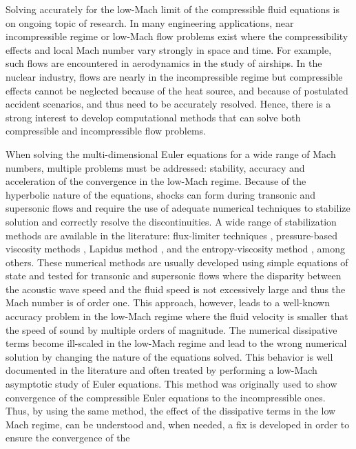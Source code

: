 \documentclass[preprint,10pt]{elsarticle}
\begin{document}
Solving accurately for the low-Mach limit of the compressible fluid equations is on ongoing topic of research. 
In many engineering applications, near incompressible regime or low-Mach flow problems exist where the compressibility effects and local
Mach number vary strongly in space and time. For example, such flows are encountered 
in aerodynamics in the study of airships. In the nuclear industry, flows are nearly in the incompressible regime but 
compressible effects cannot be neglected because of the heat source, and because of postulated accident scenarios, 
and thus need to be accurately resolved. Hence, there is a strong interest to develop computational methods 
that can solve both compressible and incompressible flow problems.  

When solving the multi-dimensional Euler equations for a wide range of Mach numbers, multiple problems must be addressed: stability, 
accuracy and acceleration of the convergence in the low-Mach regime. Because of the hyperbolic nature of the equations, 
shocks can form during transonic and supersonic flows and require the use of adequate numerical techniques to stabilize solution
and correctly resolve the discontinuities. A wide range of stabilization methods are available in the literature: flux-limiter techniques 
\cite{FluxLimiter, FluxLimiter2}, pressure-based viscosity methods \cite{PBV_book}, Lapidus method \cite{Lapidus_paper, LMP, Lapidus_book}, 
and the entropy-viscosity method \cite{jlg1, jlg2}, among others. These numerical methods are usually developed using simple equations 
of state and tested for transonic and supersonic flows where the disparity between the acoustic wave speed and the fluid speed is not 
excessively large and thus the Mach number is of order one. This approach, however, leads to a well-known accuracy problem in the low-Mach regime 
where the fluid velocity is smaller that the speed of sound by multiple orders of magnitude. The numerical dissipative terms become 
ill-scaled in the low-Mach regime and lead to the wrong numerical solution by changing the nature of the equations solved. This 
behavior is well documented in the literature \cite{LowMach1, LowMach2, LowMach3} and often treated by performing a low-Mach 
asymptotic study of Euler equations. This method was originally used \cite{LowMach1} to show convergence of the 
compressible Euler equations to the incompressible ones. Thus, by using the same method, the effect of the dissipative 
terms in the low Mach regime, can be understood and, when needed, a fix is developed in order to ensure the convergence of the 
\end{document}
